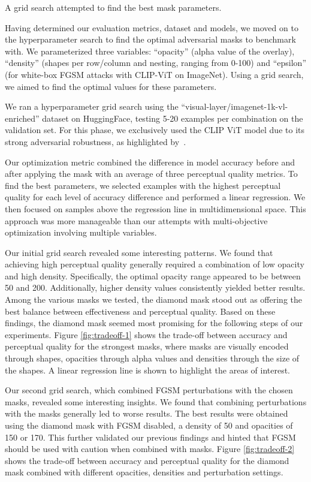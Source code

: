\documentclass[a4paper, oneside]{discothesis}
\begin{document}
A grid search attempted to find the best mask parameters.

Having determined our evaluation metrics, dataset and models, we moved on to the hyperparameter search to find the optimal adversarial masks to benchmark with. We parameterized three variables: ``opacity'' (alpha value of the overlay), ``density'' (shapes per row/column and nesting, ranging from 0-100) and ``epsilon'' (for white-box FGSM attacks with CLIP-ViT on ImageNet). Using a grid search, we aimed to find the optimal values for these parameters.

We ran a hyperparameter grid search using the ``visual-layer/imagenet-1k-vl-enriched'' dataset on HuggingFace, testing 5-20 examples per combination on the validation set. For this phase, we exclusively used the CLIP ViT model due to its strong adversarial robustness, as highlighted by~\cite{wang2024roz}.

Our optimization metric combined the difference in model accuracy before and after applying the mask with an average of three perceptual quality metrics. To find the best parameters, we selected examples with the highest perceptual quality for each level of accuracy difference and performed a linear regression. We then focused on samples above the regression line in multidimensional space. This approach was more manageable than our attempts with multi-objective optimization involving multiple variables.

Our initial grid search revealed some interesting patterns. We found that achieving high perceptual quality generally required a combination of low opacity and high density. Specifically, the optimal opacity range appeared to be between 50 and 200. Additionally, higher density values consistently yielded better results. Among the various masks we tested, the diamond mask stood out as offering the best balance between effectiveness and perceptual quality. Based on these findings, the diamond mask seemed most promising for the following steps of our experiments. Figure \ref{fig:tradeoff-1} shows the trade-off between accuracy and perceptual quality for the strongest masks, where masks are visually encoded through shapes, opacities through alpha values and densities through the size of the shapes. A linear regression line is shown to highlight the areas of interest.

Our second grid search, which combined FGSM perturbations with the chosen masks, revealed some interesting insights. We found that combining perturbations with the masks generally led to worse results. The best results were obtained using the diamond mask with FGSM disabled, a density of 50 and opacities of 150 or 170. This further validated our previous findings and hinted that FGSM should be used with caution when combined with masks. Figure \ref{fig:tradeoff-2} shows the trade-off between accuracy and perceptual quality for the diamond mask combined with different opacities, densities and perturbation settings.
\end{document}
